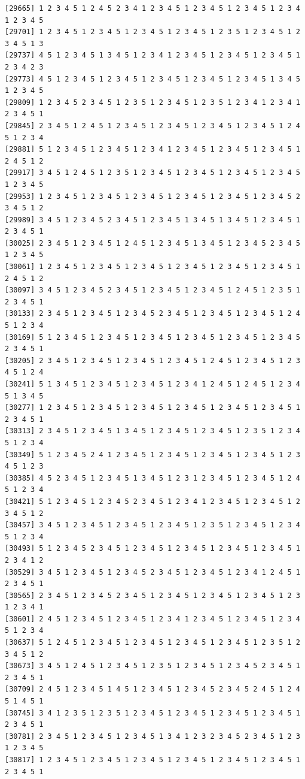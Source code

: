 \documentclass[
  11pt,
]{book}
\begin{document}
\begin{verbatim}
[29665] 1 2 3 4 5 1 2 4 5 2 3 4 1 2 3 4 5 1 2 3 4 5 1 2 3 4 5 1 2 3 4 1 2 3 4 5
[29701] 1 2 3 4 5 1 2 3 4 5 1 2 3 4 5 1 2 3 4 5 1 2 3 5 1 2 3 4 5 1 2 3 4 5 1 3
[29737] 4 5 1 2 3 4 5 1 3 4 5 1 2 3 4 1 2 3 4 5 1 2 3 4 5 1 2 3 4 5 1 2 3 4 2 3
[29773] 4 5 1 2 3 4 5 1 2 3 4 5 1 2 3 4 5 1 2 3 4 5 1 2 3 4 5 1 3 4 5 1 2 3 4 5
[29809] 1 2 3 4 5 2 3 4 5 1 2 3 5 1 2 3 4 5 1 2 3 5 1 2 3 4 1 2 3 4 1 2 3 4 5 1
[29845] 2 3 4 5 1 2 4 5 1 2 3 4 5 1 2 3 4 5 1 2 3 4 5 1 2 3 4 5 1 2 4 5 1 2 3 4
[29881] 5 1 2 3 4 5 1 2 3 4 5 1 2 3 4 1 2 3 4 5 1 2 3 4 5 1 2 3 4 5 1 2 4 5 1 2
[29917] 3 4 5 1 2 4 5 1 2 3 5 1 2 3 4 5 1 2 3 4 5 1 2 3 4 5 1 2 3 4 5 1 2 3 4 5
[29953] 1 2 3 4 5 1 2 3 4 5 1 2 3 4 5 1 2 3 4 5 1 2 3 4 5 1 2 3 4 5 2 3 4 5 1 2
[29989] 3 4 5 1 2 3 4 5 2 3 4 5 1 2 3 4 5 1 3 4 5 1 3 4 5 1 2 3 4 5 1 2 3 4 5 1
[30025] 2 3 4 5 1 2 3 4 5 1 2 4 5 1 2 3 4 5 1 3 4 5 1 2 3 4 5 2 3 4 5 1 2 3 4 5
[30061] 1 2 3 4 5 1 2 3 4 5 1 2 3 4 5 1 2 3 4 5 1 2 3 4 5 1 2 3 4 5 1 2 4 5 1 2
[30097] 3 4 5 1 2 3 4 5 2 3 4 5 1 2 3 4 5 1 2 3 4 5 1 2 4 5 1 2 3 5 1 2 3 4 5 1
[30133] 2 3 4 5 1 2 3 4 5 1 2 3 4 5 2 3 4 5 1 2 3 4 5 1 2 3 4 5 1 2 4 5 1 2 3 4
[30169] 5 1 2 3 4 5 1 2 3 4 5 1 2 3 4 5 1 2 3 4 5 1 2 3 4 5 1 2 3 4 5 2 3 4 5 1
[30205] 2 3 4 5 1 2 3 4 5 1 2 3 4 5 1 2 3 4 5 1 2 4 5 1 2 3 4 5 1 2 3 4 5 1 2 4
[30241] 5 1 3 4 5 1 2 3 4 5 1 2 3 4 5 1 2 3 4 1 2 4 5 1 2 4 5 1 2 3 4 5 1 3 4 5
[30277] 1 2 3 4 5 1 2 3 4 5 1 2 3 4 5 1 2 3 4 5 1 2 3 4 5 1 2 3 4 5 1 2 3 4 5 1
[30313] 2 3 4 5 1 2 3 4 5 1 3 4 5 1 2 3 4 5 1 2 3 4 5 1 2 3 5 1 2 3 4 5 1 2 3 4
[30349] 5 1 2 3 4 5 2 4 1 2 3 4 5 1 2 3 4 5 1 2 3 4 5 1 2 3 4 5 1 2 3 4 5 1 2 3
[30385] 4 5 2 3 4 5 1 2 3 4 5 1 3 4 5 1 2 3 1 2 3 4 5 1 2 3 4 5 1 2 4 5 1 2 3 4
[30421] 5 1 2 3 4 5 1 2 3 4 5 2 3 4 5 1 2 3 4 1 2 3 4 5 1 2 3 4 5 1 2 3 4 5 1 2
[30457] 3 4 5 1 2 3 4 5 1 2 3 4 5 1 2 3 4 5 1 2 3 5 1 2 3 4 5 1 2 3 4 5 1 2 3 4
[30493] 5 1 2 3 4 5 2 3 4 5 1 2 3 4 5 1 2 3 4 5 1 2 3 4 5 1 2 3 4 5 1 2 3 4 1 2
[30529] 3 4 5 1 2 3 4 5 1 2 3 4 5 2 3 4 5 1 2 3 4 5 1 2 3 4 1 2 4 5 1 2 3 4 5 1
[30565] 2 3 4 5 1 2 3 4 5 2 3 4 5 1 2 3 4 5 1 2 3 4 5 1 2 3 4 5 1 2 3 1 2 3 4 1
[30601] 2 4 5 1 2 3 4 5 1 2 3 4 5 1 2 3 4 1 2 3 4 5 1 2 3 4 5 1 2 3 4 5 1 2 3 4
[30637] 5 1 2 4 5 1 2 3 4 5 1 2 3 4 5 1 2 3 4 5 1 2 3 4 5 1 2 3 5 1 2 3 4 5 1 2
[30673] 3 4 5 1 2 4 5 1 2 3 4 5 1 2 3 5 1 2 3 4 5 1 2 3 4 5 2 3 4 5 1 2 3 4 5 1
[30709] 2 4 5 1 2 3 4 5 1 4 5 1 2 3 4 5 1 2 3 4 5 2 3 4 5 2 4 5 1 2 4 5 1 4 5 1
[30745] 3 4 1 2 3 5 1 2 3 5 1 2 3 4 5 1 2 3 4 5 1 2 3 4 5 1 2 3 4 5 1 2 3 4 5 1
[30781] 2 3 4 5 1 2 3 4 5 1 2 3 4 5 1 3 4 1 2 3 2 3 4 5 2 3 4 5 1 2 3 1 2 3 4 5
[30817] 1 2 3 4 5 1 2 3 4 5 1 2 3 4 5 1 2 3 4 5 1 2 3 4 5 1 2 3 4 5 1 2 3 4 5 1

\end{verbatim}
\end{document}
